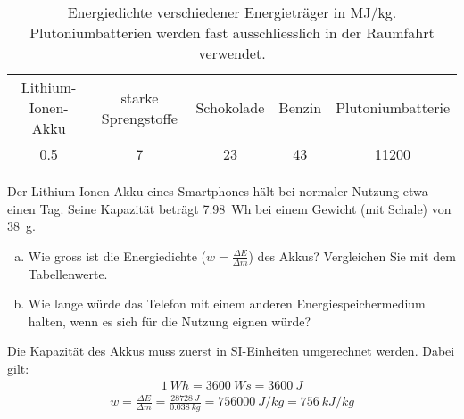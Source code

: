 
\begin{aufgabe}
	\begin{table}
		\centering
	\begin{tabular}{c|c|c|c|c}
	Lithium-Ionen-Akku & starke Sprengstoffe & Schokolade     & Benzin   & Plutoniumbatterie \\
	\num{0.5}          &  \num{7}            &\num{23}      & \num{43} & \num{11200}\\ 
		\end{tabular}
		\caption{Energiedichte verschiedener Energieträger in MJ/kg. Plutoniumbatterien werden fast ausschliesslich in der Raumfahrt verwendet.}
		\label{tab:energiedichte}
	\end{table}
	Der Lithium-Ionen-Akku eines Smartphones hält bei normaler Nutzung etwa einen Tag. 
	Seine Kapazität beträgt \SI{7.98}{Wh} bei einem Gewicht (mit Schale) von \SI{38}{g}.
	\begin{enumerate} [a)]
		\item Wie gross ist die Energiedichte ($w=\frac{\Delta E}{\Delta m}$) des Akkus? Vergleichen Sie mit dem Tabellenwerte.
		\item Wie lange würde das Telefon mit einem anderen Energiespeichermedium halten, wenn es sich für die Nutzung eignen würde?
	\end{enumerate}

	
	\begin{loesung}
	Die Kapazität des Akkus muss zuerst in SI-Einheiten umgerechnet werden. Dabei gilt:
	\begin{eqnarray*}
		\SI{1}{Wh}=\SI{3600}{Ws}=\SI{3600}{J}
	\end{eqnarray*}
	\begin{eqnarray*}
		w=\frac{\Delta E}{\Delta m}=\frac{\SI{28728}{J}}{\SI{0.038}{kg}}=\SI{756000}{J/kg}=\SI{756}{kJ/kg}
	\end{eqnarray*}
	\end{loesung}
\end{aufgabe}

